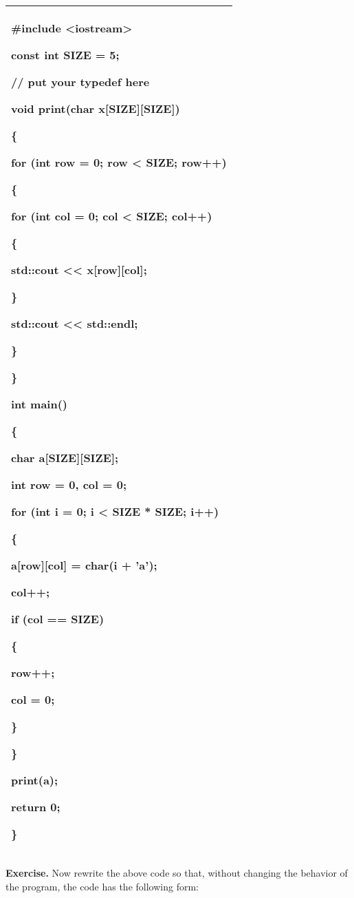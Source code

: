 \documentclass[
]{article}
\begin{document}
\begin{longtable}[]{@{}l@{}}
\toprule
\endhead
\begin{minipage}[t]{0.97\columnwidth}\raggedright
\#include \textless iostream\textgreater{}

const int SIZE = 5;

// put your typedef here

void print(char x{[}SIZE{]}{[}SIZE{]})

\{

for (int row = 0; row \textless{} SIZE; row++)

\{

for (int col = 0; col \textless{} SIZE; col++)

\{

std::cout \textless\textless{} x{[}row{]}{[}col{]};

\}

std::cout \textless\textless{} std::endl;

\}

\}

int main()

\{

char a{[}SIZE{]}{[}SIZE{]};

int row = 0, col = 0;

for (int i = 0; i \textless{} SIZE * SIZE; i++)

\{

a{[}row{]}{[}col{]} = char(i + 'a');

col++;

if (col == SIZE)

\{

row++;

col = 0;

\}

\}

print(a);

return 0;

\}\strut
\end{minipage}\tabularnewline
\bottomrule
\end{longtable}

\textbf{Exercise.} Now rewrite the above code so that, without changing
the behavior of the program, the code has the following form:
\end{document}
